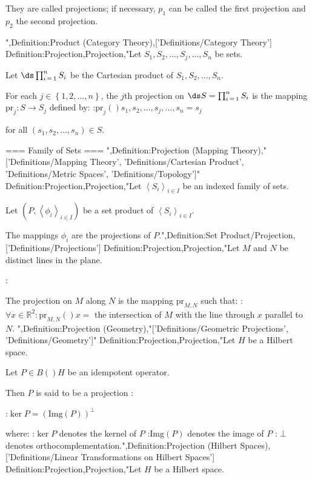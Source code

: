 They are called projections; if necessary, $p_1$ can be called the first projection and $p_2$ the second projection.

",Definition:Product (Category Theory),['Definitions/Category Theory']
Definition:Projection,Projection,"Let $S_1, S_2, \ldots, S_j, \ldots, S_n$ be sets.

Let $\ds \prod_{i \mathop = 1}^n S_i$ be the Cartesian product of $S_1, S_2, \ldots, S_n$.

For each $j \in \left\lbrace 1, 2, \ldots, n \right\rbrace$, the $j$th projection on $\ds S = \prod_{i \mathop = 1}^n S_i$ is the mapping $\mathrm {pr}_j: S \to S_j$ defined by:
:$\mathrm {pr}_j \left(   \right){s_1, s_2, \ldots, s_j, \ldots, s_n} = s_j$

for all $\left( s_1, s_2, \ldots, s_n \right) \in S$.


=== Family of Sets ===
",Definition:Projection (Mapping Theory),"['Definitions/Mapping Theory', 'Definitions/Cartesian Product', 'Definitions/Metric Spaces', 'Definitions/Topology']"
Definition:Projection,Projection,"Let $\left\langle S_i \right\rangle_{i \mathop \in I}$ be an indexed family of sets.

Let $\left( P, \left\langle \phi_i \right\rangle_{i \mathop \in I}  \right)$ be a set product of $\left\langle S_i \right\rangle_{i \mathop \in I}$.


The mappings $\phi_i$ are the projections of $P$.",Definition:Set Product/Projection,['Definitions/Projections']
Definition:Projection,Projection,"Let $M$ and $N$ be distinct lines in the plane.

:

The projection on $M$ along $N$ is the mapping $\mathrm {pr}_{M, N}$ such that:
:$\forall x \in \mathbb R^2: \mathrm {pr}_{M, N}  \left(   \right)x =$ the intersection of $M$ with the line through $x$ parallel to $N$.
",Definition:Projection (Geometry),"['Definitions/Geometric Projections', 'Definitions/Geometry']"
Definition:Projection,Projection,"Let $H$ be a Hilbert space.

Let $P \in B \left(   \right)H$ be an idempotent operator.


Then $P$ is said to be a projection :

:$\ker P = \left( \mathrm {Img} \left( P \right) \right)^\perp$

where:
:$\ker P$ denotes the kernel of $P$
:$\mathrm {Img} \left( P \right)$ denotes the image of $P$
:$\perp$ denotes orthocomplementation.",Definition:Projection (Hilbert Spaces),['Definitions/Linear Transformations on Hilbert Spaces']
Definition:Projection,Projection,"Let $H$ be a Hilbert space.

